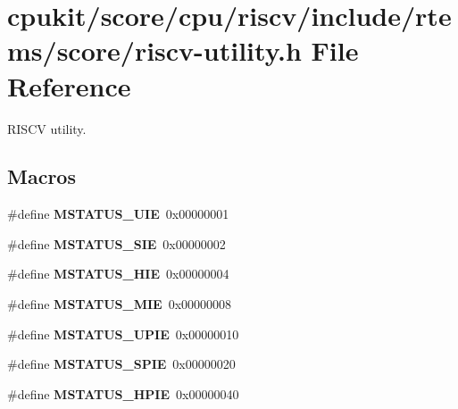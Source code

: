 \hypertarget{riscv-utility_8h}{}\section{cpukit/score/cpu/riscv/include/rtems/score/riscv-\/utility.h File Reference}
\label{riscv-utility_8h}


R\+I\+S\+CV utility.  


\subsection*{Macros}
\begin{DoxyCompactItemize}
\item 
\mbox{\label{riscv-utility_8h_a3f4df6dc4219593cb6e8bd13d636e844}} 
\#define {\bfseries M\+S\+T\+A\+T\+U\+S\+\_\+\+U\+IE}~0x00000001
\item 
\mbox{\label{riscv-utility_8h_a29a63dca3cfcf13877a0c354dc081505}} 
\#define {\bfseries M\+S\+T\+A\+T\+U\+S\+\_\+\+S\+IE}~0x00000002
\item 
\mbox{\label{riscv-utility_8h_ab549408c2d03c2e09fbfab2898683097}} 
\#define {\bfseries M\+S\+T\+A\+T\+U\+S\+\_\+\+H\+IE}~0x00000004
\item 
\mbox{\label{riscv-utility_8h_a225cb34e3b991318fa87f090cfc3fc5f}} 
\#define {\bfseries M\+S\+T\+A\+T\+U\+S\+\_\+\+M\+IE}~0x00000008
\item 
\mbox{\label{riscv-utility_8h_a17711b78183c43687036c60962c278cb}} 
\#define {\bfseries M\+S\+T\+A\+T\+U\+S\+\_\+\+U\+P\+IE}~0x00000010
\item 
\mbox{\label{riscv-utility_8h_ac7fef7988d408f1f4ebe9e3849d68bb2}} 
\#define {\bfseries M\+S\+T\+A\+T\+U\+S\+\_\+\+S\+P\+IE}~0x00000020
\item 
\mbox{\label{riscv-utility_8h_aa0f7327c94aa1210a819f1d47d3e1700}} 
\#define {\bfseries M\+S\+T\+A\+T\+U\+S\+\_\+\+H\+P\+IE}~0x00000040
\item 
\mbox{\label{riscv-utility_8h_a05fc511bb3d22b5e1abe8b9ccb30e7b3}} 

\end{DoxyCompactItemize}
